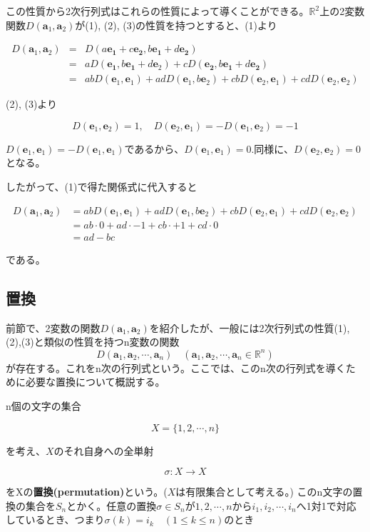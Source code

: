 \documentclass[dvipdfmx,autodetect-engine]{jsarticle}
\theoremstyle{definition}
\newcommand{\vecSpace}[1]{\mathbb{R}^{#1}}
\begin{document}
この性質から2次行列式はこれらの性質によって導くことができる。$\vecSpace{2}$上の2変数関数$D(\bm{a}_1, \bm{a}_2)$が(1), (2), (3)の性質を持つとすると、(1)より

\begin{eqnarray*}
D(\bm{a}_1, \bm{a}_2) &= &D(a\bm{e_1} + c\bm{e_2}, b\bm{e_1} + d\bm{e_2}) \\
&= &aD(\bm{e_1}, b\bm{e_1} + d \bm{e}_2) + cD(\bm{e_2}, b\bm{e_1} + d\bm{e_2}) \\
&= &abD(\bm{e}_1, \bm{e}_1) + adD(\bm{e}_1, b\bm{e}_2) + cbD(\bm{e}_2, \bm{e}_1) + cdD(\bm{e}_2, \bm{e}_2)
\end{eqnarray*}

(2), (3)より

$$
D(\bm{e}_1, \bm{e}_2) = 1, \quad D(\bm{e}_2, \bm{e}_1) = -D(\bm{e}_1, \bm{e}_2) = -1
$$

$D(\bm{e}_1, \bm{e}_1) = -D(\bm{e}_1, \bm{e}_1)$であるから、$D(\bm{e}_1, \bm{e}_1) = 0$.同様に、$D(\bm{e}_2, \bm{e}_2) = 0$となる。

したがって、(1)で得た関係式に代入すると

\begin{equation*}
\begin{split}
D(\bm{a}_1, \bm{a}_2) &= abD(\bm{e}_1, \bm{e}_1) + adD(\bm{e}_1, b\bm{e}_2) + cbD(\bm{e}_2, \bm{e}_1) + cdD(\bm{e}_2, \bm{e}_2) \\
&= ab \cdot 0 + ad \cdot -1 + cb \cdot + 1 + cd \cdot 0 \\
&= ad - bc
\end{split}
\end{equation*}

である。

\subsection{置換}

前節で、2変数の関数$D(\bm{a}_1, \bm{a}_2)$を紹介したが、一般には2次行列式の性質(1),(2),(3)と類似の性質を持つn変数の関数
$$
D(\bm{a}_1, \bm{a}_2, \cdots, \bm{a}_n) \quad (\bm{a}_1, \bm{a}_2, \cdots, \bm{a}_n \in \vecSpace{n})
$$
が存在する。これをn次の行列式という。ここでは、このn次の行列式を導くために必要な置換について概説する。

n個の文字の集合

$$
X = \{1, 2, \cdots, n\}
$$

を考え、$X$のそれ自身への全単射

$$
\sigma: X \to X
$$

をXの{\bf 置換(permutation)}という。($X$は有限集合として考える。)
このn文字の置換の集合を$S_n$とかく。任意の置換$\sigma \in S_n$が$1, 2, \cdots, n$から$i_1, i_2, \cdots, i_n$へ1対1で対応しているとき、つまり$\sigma(k) = i_k \quad (1 \leq k \leq n)$のとき
\end{document}
